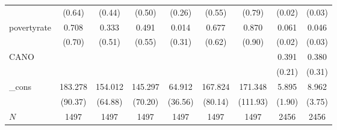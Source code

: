 {\begin{tabular}{l*{8}{c}}
            &                   (0.64)         &                   (0.44)         &                   (0.50)         &                   (0.26)         &                   (0.55)         &                   (0.79)         &                   (0.02)         &                   (0.03)         \\
povertyrate &                    0.708         &                    0.333         &                    0.491         &                    0.014         &                    0.677         &                    0.870         &                    0.061\sym{***}&                    0.046         \\
            &                   (0.70)         &                   (0.51)         &                   (0.55)         &                   (0.31)         &                   (0.62)         &                   (0.90)         &                   (0.02)         &                   (0.03)         \\
CANO        &                                  &                                  &                                  &                                  &                                  &                                  &                    0.391         &                    0.380         \\
            &                                  &                                  &                                  &                                  &                                  &                                  &                   (0.21)         &                   (0.31)         \\
\_cons      &                  183.278\sym{*}  &                  154.012\sym{*}  &                  145.297\sym{*}  &                   64.912         &                  167.824\sym{*}  &                  171.348         &                    5.895\sym{**} &                    8.962\sym{*}  \\
            &                  (90.37)         &                  (64.88)         &                  (70.20)         &                  (36.56)         &                  (80.14)         &                 (111.93)         &                   (1.90)         &                   (3.75)         \\
\hline
\(N\)       &                     1497         &                     1497         &                     1497         &                     1497         &                     1497         &                     1497         &                     2456         &                     2456         \\
\hline\hline
\end{tabular}
}
